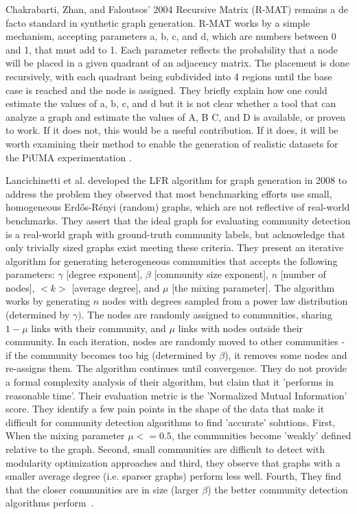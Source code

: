\par{Chakrabarti, Zhan, and Faloutsos' 2004 Recursive Matrix (R-MAT) remains a de facto standard in synthetic graph generation. 
R-MAT works by a simple mechanism, accepting parameters a, b, c, and d, which are numbers between 0 and 1, that must add to 1. 
Each parameter reflects the probability that a node will be placed in a given quadrant of an adjacency matrix. 
The placement is done recursively, with each quadrant being subdivided into 4 regions until the base case is reached and the node is assigned. 
They briefly explain how one could estimate the values of a, b, c, and d but it is not clear whether a tool that can analyze a graph and estimate the values of A, B C, and D is available, or proven to work. 
If it does not, this would be a useful contribution. 
If it does, it will be worth examining their method to enable the generation of realistic datasets for the PiUMA experimentation \cite{Chakrabarti2004}.}

\par{Lancichinetti et al. developed the LFR algorithm for graph generation in 2008 to address the problem they observed that most benchmarking efforts use small, homogeneous Erdős-Rényi (random) graphs, which are not reflective of real-world benchmarks. 
They assert that the ideal graph for evaluating community detection is a real-world graph with ground-truth community labels, but acknowledge that only trivially sized graphs exist meeting these criteria. 
They present an iterative algorithm for generating heterogeneous communities that accepts the following parameters: $\gamma$ [degree exponent], $\beta$ [community size exponent], $n$ [number of nodes], $<k>$ [average degree], and $\mu$ [the mixing parameter]. 
The algorithm works by generating $n$ nodes with degrees sampled from a power law distribution (determined by $\gamma)$. 
The nodes are randomly assigned to communities, sharing $1-\mu$ links with their community, and $\mu$ links with nodes outside their community. 
In each iteration, nodes are randomly moved to other communities - if the community becomes too big (determined by $\beta$), it removes some nodes and re-assigns them. 
The algorithm continues until convergence. 
They do not provide a formal complexity analysis of their algorithm, but claim that it 'performs in reasonable time'. 
Their evaluation metric is the 'Normalized Mutual Information' score. 
They identify a few pain points in the shape of the data that make it difficult for community detection algorithms to find 'accurate' solutions.
 First, When the mixing parameter $\mu <= 0.5$, the communities become 'weakly' defined relative to the graph. 
 Second, small communities are difficult to detect with modularity optimization approaches and third, they observe that graphs with a smaller average degree (i.e. sparser graphs) perform less well. 
 Fourth, They find that the closer communities are in size (larger $\beta$) the better community detection algorithms perform~\cite{Lancichinetti2008}.}

